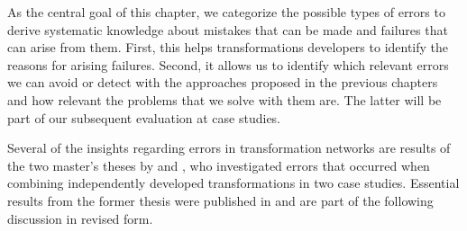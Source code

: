 
As the central goal of this chapter, we categorize the possible types of errors to derive systematic knowledge about mistakes that can be made and failures that can arise from them.
First, this helps transformations developers to identify the reasons for arising failures.
Second, it allows us to identify which relevant errors we can avoid or detect with the approaches proposed in the previous chapters and how relevant the problems that we solve with them are.
The latter will be part of our subsequent evaluation at case studies.

Several of the insights regarding errors in transformation networks are results of the two master's theses by \textcite{syma2018ma} and \textcite{saglam2020ma}, who investigated errors that occurred when combining independently developed transformations in two case studies.
Essential results from the former thesis were published in  and are part of the following discussion in revised form.





